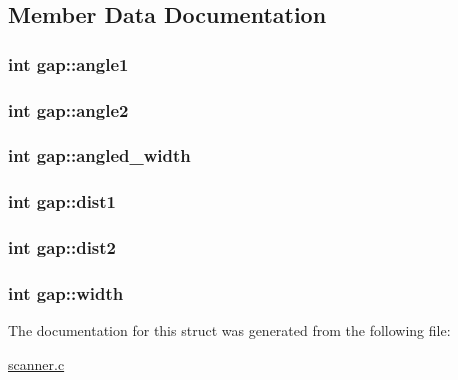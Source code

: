 \subsection{Member Data Documentation}
\hypertarget{structgap_a17dbc8bf80a688022980b16e19578ec7}{
\subsubsection[{angle1}]{\setlength{\rightskip}{0pt plus 5cm}int {\bf gap::angle1}}}
\label{structgap_a17dbc8bf80a688022980b16e19578ec7}
\hypertarget{structgap_a2108c6c9b6cbfbd92801a31768c8f3e3}{
\subsubsection[{angle2}]{\setlength{\rightskip}{0pt plus 5cm}int {\bf gap::angle2}}}
\label{structgap_a2108c6c9b6cbfbd92801a31768c8f3e3}
\hypertarget{structgap_a141c484cd04a6a8b9bd52e970c5c46e7}{
\subsubsection[{angled\_\-width}]{\setlength{\rightskip}{0pt plus 5cm}int {\bf gap::angled\_\-width}}}
\label{structgap_a141c484cd04a6a8b9bd52e970c5c46e7}
\hypertarget{structgap_aa48958ad51bcf6b1a2ad8b4d0aa1ea98}{
\subsubsection[{dist1}]{\setlength{\rightskip}{0pt plus 5cm}int {\bf gap::dist1}}}
\label{structgap_aa48958ad51bcf6b1a2ad8b4d0aa1ea98}
\hypertarget{structgap_ae02e438f36655218b9336b4c72a6f571}{
\subsubsection[{dist2}]{\setlength{\rightskip}{0pt plus 5cm}int {\bf gap::dist2}}}
\label{structgap_ae02e438f36655218b9336b4c72a6f571}
\hypertarget{structgap_a52141682fa04fedf9e985d8dd7518947}{
\subsubsection[{width}]{\setlength{\rightskip}{0pt plus 5cm}int {\bf gap::width}}}
\label{structgap_a52141682fa04fedf9e985d8dd7518947}


The documentation for this struct was generated from the following file:\begin{DoxyCompactItemize}
\item 
\hyperlink{scanner_8c}{scanner.c}\end{DoxyCompactItemize}
